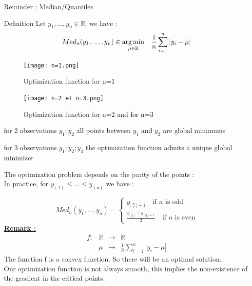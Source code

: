 \documentclass[unknownkeysallowed]{beamer}
\begin{document}
\begin{frame}{Reminder : Median/Quantiles}


\begin{alertblock}{Definition}
Let $y_1, \dots , y_n \in \mathbb{R} $, we have :
$$Med_{n}(y_1,\dots,y_n)\in \underset{ \mu \in \mathbb{R}} {\operatorname*{arg\,min}} \quad \frac{1}{n} \sum_{i=1}^n |y_i-\mu|$$
\end{alertblock}

\begin{figure}[H]
    \centering
    \texttt{[image: n=1.png]}
    \caption{Optimization function for n=1}
    \label{fig}
\end{figure}

\end{frame}

\begin{frame}
\begin{figure}[H]
    \centering
    \texttt{[image: n=2 et n=3.png]}
    \caption{Optimization function for n=2 and for n=3}
    \label{fig}
\end{figure}

for 2 observations $y_1; y_2$ all points between $y_1$ and $y_2$ are global minimums

for 3 observations $y_1; y_2; y_3$ the optimization function admits a unique global minimizer

\end{frame}

\begin{frame}
 The optimization problem depends on the parity of the points :\\
 In practice, for  $y_{(1)} \leqslant \dots \leqslant y_{(n)}$ we have :
 
 $$Med_{n}(y_{1}, \dots, y_{n}) =
\left\{
    \begin{array}{ll}
        y_{\lfloor\frac{n}{2}\rfloor+1} \quad \text{if $n$ is odd}\\
        \frac{y_{\lfloor\frac{n}{2}\rfloor}+y_{\lfloor\frac{n}{2}\rfloor+1}}{2} \quad \text{if $n$ is even}
    \end{array}
\right.
$$
\vspace{1cm}
\underline{\textbf{Remark :}}\\
$$\begin{array}{l|rcl}
    f : & \mathbb{R} & \longrightarrow & \mathbb{R} \\
    & \mu & \longmapsto &  \frac{1}{n} \sum_{i=1}^{n} |y_{i}-\mu|
\end{array}$$
The function f is a convex function. So there will be an optimal solution.\\
Our optimization function is not always smooth, this implies the non-existence of the gradient in the critical points.

\end{frame}
\end{document}
